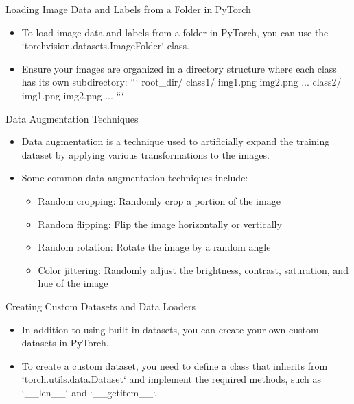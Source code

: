 \documentclass{beamer}
\begin{document}
\begin{frame}{Loading Image Data and Labels from a Folder in PyTorch}
\begin{itemize}
    \item To load image data and labels from a folder in PyTorch, you can use the `torchvision.datasets.ImageFolder` class.
    \item Ensure your images are organized in a directory structure where each class has its own subdirectory:
    ```         
    root_dir/
        class1/
            img1.png
            img2.png
            ...
        class2/
            img1.png
            img2.png
            ...
    ```
\end{itemize}
\end{frame}

\begin{frame}{Data Augmentation Techniques}
\begin{itemize}
    \item Data augmentation is a technique used to artificially expand the training dataset by applying various transformations to the images. 
    \item Some common data augmentation techniques include:
        \begin{itemize}
            \item Random cropping: Randomly crop a portion of the image
            \item Random flipping: Flip the image horizontally or vertically
            \item Random rotation: Rotate the image by a random angle
            \item Color jittering: Randomly adjust the brightness, contrast, saturation, and hue of the image
        \end{itemize}
\end{itemize}
\end{frame}

\begin{frame}{Creating Custom Datasets and Data Loaders}
\begin{itemize}
    \item In addition to using built-in datasets, you can create your own custom datasets in PyTorch. 
    \item To create a custom dataset, you need to define a class that inherits from `torch.utils.data.Dataset` and implement the required methods, such as `__len__` and `__getitem__`.
\end{itemize}
\end{frame}
\end{document}
